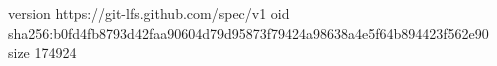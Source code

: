 version https://git-lfs.github.com/spec/v1
oid sha256:b0fd4fb8793d42faa90604d79d95873f79424a98638a4e5f64b894423f562e90
size 174924
